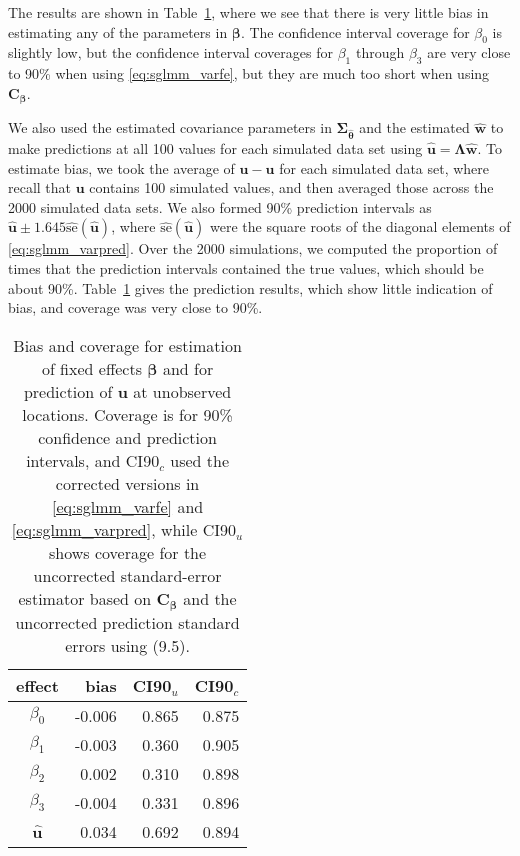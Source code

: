 \documentclass[12pt, titlepage]{article}
\begin{document}
The results are shown in Table~\ref{tab:sglm_fe}, where we see that there is very little bias in estimating any of the parameters in $\boldsymbol{\beta}$.  The confidence interval coverage for $\beta_{0}$ is slightly low, but the confidence interval coverages for $\beta_{1}$ through $\beta_{3}$ are very close to 90\% when using \eqref{eq:sglmm_varfe}, but they are much too short when using $\mathbf{C}_{\boldsymbol{\beta}}$.

We also used the estimated covariance parameters in $\boldsymbol{\Sigma}_{\hat{\boldsymbol{\theta}}}$ and the estimated $\hat{\mathbf{w}}$ to make predictions at all 100 values for each simulated data set using $\hat{\mathbf{u}} = \boldsymbol{\Lambda}\hat{\mathbf{w}}$.  To estimate bias, we took the average of $\hat{\mathbf{u}} - \mathbf{u}$ for each simulated data set, where recall that $\mathbf{u}$ contains 100 simulated values, and then averaged those across the 2000 simulated data sets.  We also formed 90\% prediction intervals as $\hat{\mathbf{u}} \pm 1.645 \widehat{\textrm{se}}(\hat{\mathbf{u}})$, where $\widehat{\textrm{se}}(\hat{\mathbf{u}})$ were the square roots of the diagonal elements of \eqref{eq:sglmm_varpred}. Over the 2000 simulations, we computed the proportion of times that the prediction intervals contained the true values, which should be about 90\%. Table~\ref{tab:sglm_fe} gives the prediction results, which show little indication of bias, and coverage was very close to 90\%.

\begin{table}[H] 
	\caption{Bias and coverage for estimation of fixed effects $\boldsymbol{\beta}$ and for prediction of $\mathbf{u}$ at unobserved locations.  Coverage is for 90\% confidence and prediction intervals, and CI90$_{c}$ used the corrected versions in \eqref{eq:sglmm_varfe} and \eqref{eq:sglmm_varpred}, while CI90$_{u}$ shows coverage for the uncorrected standard-error estimator based on $\mathbf{C}_{\boldsymbol{\beta}}$ and the uncorrected prediction standard errors using (9.5).  \label{tab:sglm_fe}}
\begin{center}
\begin{tabular}{|c|rrr|}
\hline
\hline
effect & bias & CI90$_{u}$ & CI90$_{c}$ \\
\hline{}
$\beta_{0}$ & -0.006 & 0.865 & 0.875 \\ 
$\beta_{1}$ &    -0.003 & 0.360 & 0.905 \\ 
$\beta_{2}$ &   0.002 & 0.310 & 0.898 \\ 
$\beta_{3}$ &   -0.004 & 0.331 & 0.896 \\ 
$\hat{\mathbf{u}}$ &   0.034 & 0.692 & 0.894 \\  
\hline
\hline
\end{tabular}
\end{center}
\end{table}
\end{document}
